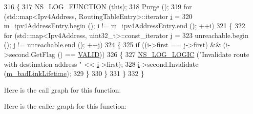 \begin{DoxyCode}
316 \{
317   \hyperlink{log-macros-disabled_8h_a90b90d5bad1f39cb1b64923ea94c0761}{NS\_LOG\_FUNCTION} (\textcolor{keyword}{this});
318   \hyperlink{classns3_1_1aodv_1_1RoutingTable_a2d0250f231e06733c06a43f5ec6a310b}{Purge} ();
319   \textcolor{keywordflow}{for} (std::map<Ipv4Address, RoutingTableEntry>::iterator \hyperlink{bernuolliDistribution_8m_a6f6ccfcf58b31cb6412107d9d5281426}{i} =
320          \hyperlink{classns3_1_1aodv_1_1RoutingTable_adb33ba98f0792226c0f1ea7f260f3139}{m\_ipv4AddressEntry}.begin (); \hyperlink{bernuolliDistribution_8m_a6f6ccfcf58b31cb6412107d9d5281426}{i} != \hyperlink{classns3_1_1aodv_1_1RoutingTable_adb33ba98f0792226c0f1ea7f260f3139}{m\_ipv4AddressEntry}.end (); 
      ++\hyperlink{bernuolliDistribution_8m_a6f6ccfcf58b31cb6412107d9d5281426}{i})
321     \{
322       \textcolor{keywordflow}{for} (std::map<Ipv4Address, uint32\_t>::const\_iterator j =
323              unreachable.begin (); j != unreachable.end (); ++j)
324         \{
325           \textcolor{keywordflow}{if} ((\hyperlink{bernuolliDistribution_8m_a6f6ccfcf58b31cb6412107d9d5281426}{i}->first == j->first) && (\hyperlink{bernuolliDistribution_8m_a6f6ccfcf58b31cb6412107d9d5281426}{i}->second.GetFlag () == \hyperlink{group__aodv_gga44216921a9c725a5ab8bc19059052a26af5fecee96bb2650aa417994840b43c99}{VALID}))
326             \{
327               \hyperlink{group__logging_ga88acd260151caf2db9c0fc84997f45ce}{NS\_LOG\_LOGIC} (\textcolor{stringliteral}{"Invalidate route with destination address "} << 
      \hyperlink{bernuolliDistribution_8m_a6f6ccfcf58b31cb6412107d9d5281426}{i}->first);
328               \hyperlink{bernuolliDistribution_8m_a6f6ccfcf58b31cb6412107d9d5281426}{i}->second.Invalidate (\hyperlink{classns3_1_1aodv_1_1RoutingTable_a51bd9310a9318a82e49d943fba7b8577}{m\_badLinkLifetime});
329             \}
330         \}
331     \}
332 \}
\end{DoxyCode}


Here is the call graph for this function\+:




Here is the caller graph for this function\+:


